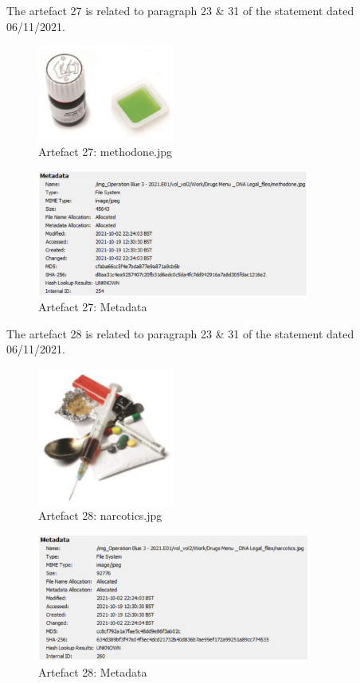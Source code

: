 The artefact 27 is related to paragraph 23 \& 31 of the statement
dated 06/11/2021.
\begin{figure}[H]
  \centering
  \includegraphics[width=0.4\textwidth]{figures/artefact27}
  \caption{Artefact 27: methodone.jpg}
  \label{f:artefact27}
\end{figure}
\begin{figure}[H]
  \centering
  \includegraphics[width=0.8\textwidth]{figures/meta27}
  \caption{Artefact 27: Metadata}
  \label{f:meta27}
\end{figure}
The artefact 28 is related to paragraph 23 \& 31 of the statement
dated 06/11/2021.
\begin{figure}[H]
  \centering
  \includegraphics[width=0.4\textwidth]{figures/artefact28}
  \caption{Artefact 28: narcotics.jpg}
  \label{f:artefact28}
\end{figure}
\begin{figure}[H]
  \centering
  \includegraphics[width=0.8\textwidth]{figures/meta28}
  \caption{Artefact 28: Metadata}
  \label{f:meta28}
\end{figure}

